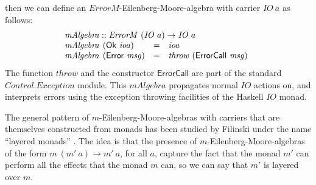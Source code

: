 \documentclass{jfp1}
\begin{document}
then we can define an $\mathit{ErrorM}$-Eilenberg-Moore-algebra with
carrier $\mathit{IO}~a$ as follows:
\begin{displaymath}
  \begin{array}{l}
    \mathit{mAlgebra} :: \mathit{ErrorM}~(\mathit{IO}~a) \to \mathit{IO}~a \\
    \begin{array}{@{}l@{\hspace{0.4em}}lcl}
      \mathit{mAlgebra}&(\mathsf{Ok}~\mathit{ioa}) & = & \mathit{ioa} \\
      \mathit{mAlgebra}&(\mathsf{Error}~\mathit{msg}) & = & \mathit{throw}~(\mathsf{ErrorCall}~\mathit{msg})
    \end{array}
  \end{array}
\end{displaymath}
The function $\mathit{throw}$ and the constructor $\mathsf{ErrorCall}$
are part of the standard $\mathit{Control.Exception}$ module. This
$\mathit{mAlgebra}$ propagates normal $\mathit{IO}$ actions on, and
interprets errors using the exception throwing facilities of the
Haskell $\mathit{IO}$ monad.

The general pattern of $m$-Eilenberg-Moore-algebras with carriers that
are themselves constructed from monads has been studied by Filinski
under the name ``layered monads'' \cite{filinski99representing}. The
idea is that the presence of $m$-Eilenberg-Moore-algebras of the form
$m~(m'~a) \to m'~a$, for all $a$, capture the fact that the monad $m'$
can perform all the effects that the monad $m$ can, so we can say that
$m'$ is layered over $m$.
\end{document}
